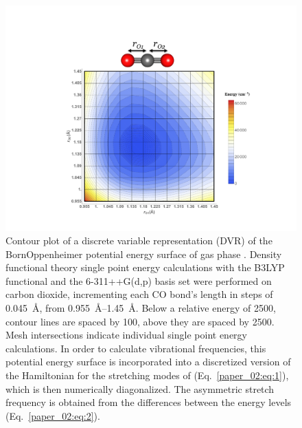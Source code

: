 \begin{figure}
  \centering
  \includegraphics[scale=0.75]{paper_02/Fig1.pdf}
  \caption[DVR contour plot]{Contour plot of a discrete variable representation (DVR) of the Born\textendash{}Oppenheimer potential energy surface of gas phase . Density functional theory single point energy calculations with the B3LYP functional and the 6-311++G(d,p) basis set were performed on carbon dioxide, incrementing each CO bond's length in steps of \SI{0.045}{\angstrom}, from \SIrange{0.955}{1.45}{\angstrom}. Below a relative energy of \SI{2500}{\wavenumber}, contour lines are spaced by \SI{100}{\wavenumber}, above they are spaced by \SI{2500}{\wavenumber}. Mesh intersections indicate individual single point energy calculations. In order to calculate vibrational frequencies, this potential energy surface is incorporated into a discretized version of the Hamiltonian for the stretching modes of  (Eq.~\ref{paper_02:eq:1}), which is then numerically diagonalized. The asymmetric stretch frequency is obtained from the differences between the energy levels (Eq.~\ref{paper_02:eq:2}).}
  \label{paper_02:fig:1}
\end{figure}

\section{\texorpdfstring{}{Sensitivity of the Calculated Vibrational Signatures to the Underlying Computational and Chemical Model}}
\label{paper_02:sec:III}


